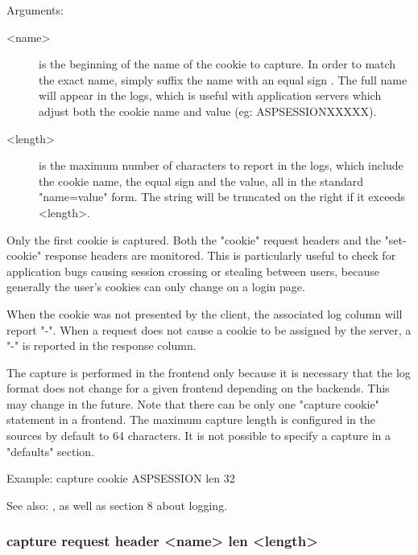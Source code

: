   Arguments:
  \begin{description} 
  \item[<name>]    is the beginning of the name of the cookie to capture. In order
              to match the exact name, simply suffix the name with an equal
              sign \chr{=}. The full name will appear in the logs, which is
              useful with application servers which adjust both the cookie name
              and value (eg: ASPSESSIONXXXXX).

  \item[<length>]  is the maximum number of characters to report in the logs, which
              include the cookie name, the equal sign and the value, all in the
              standard "name=value" form. The string will be truncated on the
              right if it exceeds <length>.
  \end{description}

  Only the first cookie is captured. Both the "cookie" request headers and the
  "set-cookie" response headers are monitored. This is particularly useful to
  check for application bugs causing session crossing or stealing between
  users, because generally the user's cookies can only change on a login page.

  When the cookie was not presented by the client, the associated log column
  will report "-". When a request does not cause a cookie to be assigned by the
  server, a "-" is reported in the response column.

  The capture is performed in the frontend only because it is necessary that
  the log format does not change for a given frontend depending on the
  backends. This may change in the future. Note that there can be only one
  "capture cookie" statement in a frontend. The maximum capture length is
  configured in the sources by default to 64 characters. It is not possible to
  specify a capture in a "defaults" section.

  \begin{example}{Example:}
  capture cookie ASPSESSION len 32
  \end{example}
  
  See also: ,  as well as
            section 8 about logging.

\subsubsection[capture request header]{capture request header <name> len <length>}
  

